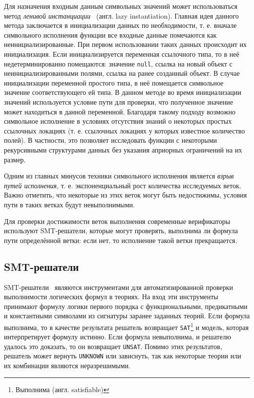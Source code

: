 Для назначения входным данным символьных значений может использоваться метод \emph{ленивой инстанциации}~\cite{khurshid2003generalized} (англ. lazy instantiation). Главная идея данного метода заключается в инициализации данных по необходимости, т. е. вначале символьного исполнения функции все входные данные помечаются как неинициализированные. При первом использовании таких данных происходит их инициализация. Если инициализируется переменная ссылочного типа, то в неё недетерминированно помещаются: значение \texttt{null}, ссылка на новый объект с неинициализированными полями, ссылка на ранее созданный объект. В случае инициализации переменной простого типа, в неё помещается символьное значение соответствующего ей типа. В данном методе во время инициализации значений используется условие пути для проверки, что полученное значение может находиться в данной переменной. Благодаря такому подходу возможно символьное исполнение в условиях отсутствия знаний о некоторых простых ссылочных локациях (т. е. ссылочных локациях у которых известное количество полей). В частности, это позволяет исследовать функции с некоторыми рекурсивными структурами данных без указания априорных ограничений на их размер.

Одним из главных минусов техники символьного исполнения является \emph{взрыв путей исполнения}, т. е. экспоненциальный рост количества исследуемых веток. Важно отметить, что некоторые из этих веток могут быть недостижимы, условия пути в таких ветках будут невыполнимыми.

Для проверки достижимости веток выполнения современные верификаторы~\cite{sethu2018systems, yoshida2017klover, sharma2018veritesting} используют SMT-решатели, которые могут проверять, выполнима ли формула пути определённой ветки: если нет, то исполнение такой ветки прекращается.

\subsection{SMT-решатели}\label{smt}

SMT-решатели~\cite{de2008z3, barrett2011cvc4} являются инструментами для автоматизированной проверки выполнимости логических формул в теориях. На вход эти инструменты принимают формулу логики первого порядка с функциональными, предикатными и константными символами из сигнатуры заранее заданных теорий. Если формула выполнима, то в качестве результата решатель возвращает \texttt{SAT}\footnote{Выполнима (англ. satisfiable)} и модель, которая интерпретирует формулу истинно. Если формула невыполнима, и решателю удалось это доказать, то он возвращает \texttt{UNSAT}. Помимо этих результатов, решатель может вернуть \texttt{UNKNOWN} или зависнуть, так как некоторые теории или их комбинации являются неразрешимыми.

